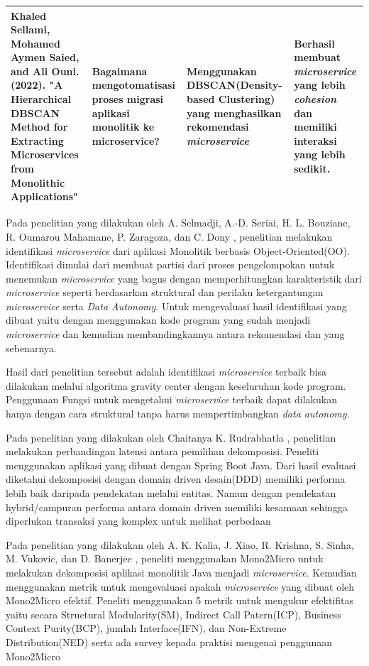 \begin{small}
\begin{longtable}{|p{3cm}|p{3.5cm}|p{3cm}|p{3.5cm}|}
		\hline
		Khaled Sellami, Mohamed Aymen Saied, and Ali Ouni. (2022). "\textbf{A Hierarchical
		DBSCAN Method for Extracting Microservices from Monolithic Applications}" \cite{ECD} &
		Bagaimana mengotomatisasi proses migrasi aplikasi monolitik ke microservice?  &
	    Menggunakan DBSCAN(Density-based Clustering) yang menghasilkan rekomendasi \textit{microservice}  &
		Berhasil membuat \textit{microservice} yang lebih \textit{cohesion} dan memiliki interaksi yang lebih sedikit. 
		\\
		\hline
	\end{longtable}
\end{small}
\endgroup
Pada penelitian yang dilakukan oleh  A. Selmadji, A.-D. Seriai, H. L. Bouziane, R. Oumarou Mahamane, P. Zaragoza, dan C. Dony \cite{5B1}, penelitian melakukan identifikasi \textit{microservice} dari aplikasi Monolitik berbasis Object-Oriented(OO). Identifikasi  dimulai dari membuat partisi dari proses pengelompokan untuk menemukan \textit{microservice} yang bagus dengan memperhitungkan karakteristik dari \textit{microservice} seperti berdasarkan struktural dan perilaku ketergantungan \textit{microservice} serta \textit{Data Autonomy}. Untuk mengevaluasi hasil identifikasi yang dibuat yaitu dengan menggunakan kode program yang sudah menjadi \textit{microservice} dan kemudian membandingkannya antara rekomendasi dan yang sebenarnya. 

Hasil dari penelitian tersebut adalah identifikasi \textit{microservice} terbaik bisa dilakukan melalui algoritma gravity center dengan keseluruhan kode program. Penggunaan Fungsi untuk mengetahui \textit{microservice} terbaik dapat dilakukan hanya dengan cara struktural tanpa harus mempertimbangkan \textit{data autonomy}.

Pada penelitian yang dilakukan oleh Chaitanya K. Rudrabhatla \cite{6C1}, penelitian melakukan perbandingan latensi antara pemilihan dekomposisi. Peneliti menggunakan aplikasi yang dibuat dengan Spring Boot Java. Dari hasil evaluasi diketahui dekomposisi dengan domain driven desain(DDD)  memiliki performa lebih baik daripada pendekatan melalui entitas. Namun dengan pendekatan hybrid/campuran performa antara domain driven memiliki kesamaan sehingga diperlukan transaksi yang komplex untuk melihat perbedaan

Pada penelitian yang dilakukan oleh A. K. Kalia, J. Xiao, R. Krishna, S. Sinha, M. Vukovic, dan D. Banerjee \cite{8EA}, peneliti menggunakan Mono2Micro untuk melakukan dekomposisi aplikasi monolitik Java menjadi \textit{microservice}. Kemudian menggunakan metrik untuk mengevaluasi apakah \textit{microservice} yang dibuat oleh Mono2Micro efektif. Peneliti menggunakan 5 metrik untuk mengukur efektifitas yaitu  secara Structural Modularity(SM), Indirect Call Patern(ICP), Business Context Purity(BCP), jumlah Interface(IFN), dan Non-Extreme Distribution(NED) serta ada survey kepada praktisi mengenai penggunaan Mono2Micro

